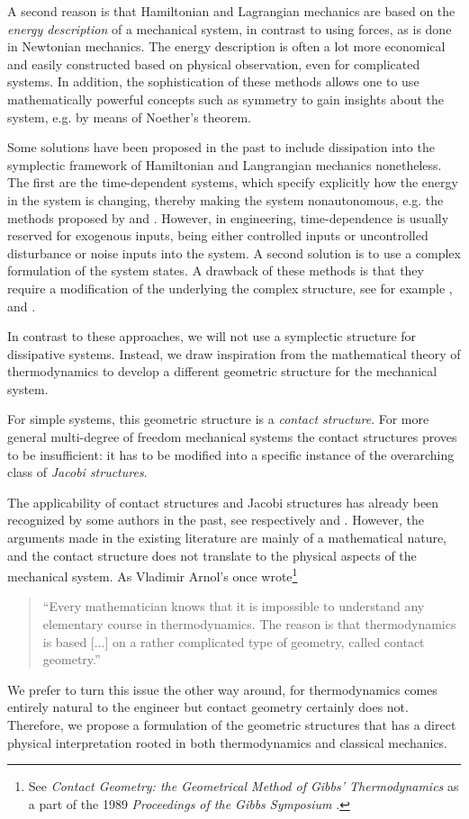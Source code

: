 A second reason is that Hamiltonian and Lagrangian mechanics are based on the \emph{energy description} of a mechanical system, in contrast to using forces, as is done in Newtonian mechanics. The energy description is often a lot more economical and easily constructed based on physical observation, even for complicated systems. In addition, the sophistication of these methods allows one to use mathematically powerful concepts such as symmetry to gain insights about the system, e.g. by means of Noether's theorem.

Some solutions have been proposed in the past to include dissipation into the symplectic framework of Hamiltonian and Langrangian mechanics nonetheless. The first are the time-dependent systems, which specify explicitly how the energy in the system is changing, thereby making the system nonautonomous, e.g. the methods proposed by \citet{Caldirola1941} and \citet{Kanai1948}. However, in engineering, time-dependence is usually reserved for exogenous inputs, being either controlled inputs or uncontrolled disturbance or noise inputs into the system. A second solution is to use a complex formulation of the system states. A drawback of these methods is that they require a modification of the underlying the complex structure, see for example \citet{Hutters2020}, \citet{Dedene1980} and \citet{Rajeev2007}.

In contrast to these approaches, we will not use a symplectic structure for dissipative systems. Instead, we draw inspiration from the mathematical theory of thermodynamics to develop a different geometric structure for the mechanical system.

For simple systems, this geometric structure is a \emph{contact structure}. For more general multi-degree of freedom mechanical systems the contact structures proves to be insufficient: it has to be modified into a specific instance of the overarching class of \emph{Jacobi structures}. 

The applicability of contact structures and Jacobi structures has already been recognized by some authors in the past, see respectively \citet{Bravetti2017} and \citet{ciaglia2018}. However, the arguments made in the existing literature are mainly of a mathematical nature, and the contact structure does not translate to the physical aspects of the mechanical system. As Vladimir Arnol's once wrote\footnote{See \emph{Contact Geometry: the Geometrical Method of Gibbs' Thermodynamics} as a part of the 1989 \emph{Proceedings of the Gibbs Symposium} \cite[p. 163]{Arnold1989b}.}
\begin{quote}
``Every mathematician knows that it is impossible to understand any elementary course in thermodynamics. The reason is that thermodynamics is based [...] on a rather complicated type of geometry, called contact geometry.''
\end{quote}
We prefer to turn this issue the other way around, for thermodynamics comes entirely natural to the engineer but contact geometry certainly does not. Therefore, we propose a formulation of the geometric structures that has a direct physical interpretation rooted in both thermodynamics and classical mechanics.

